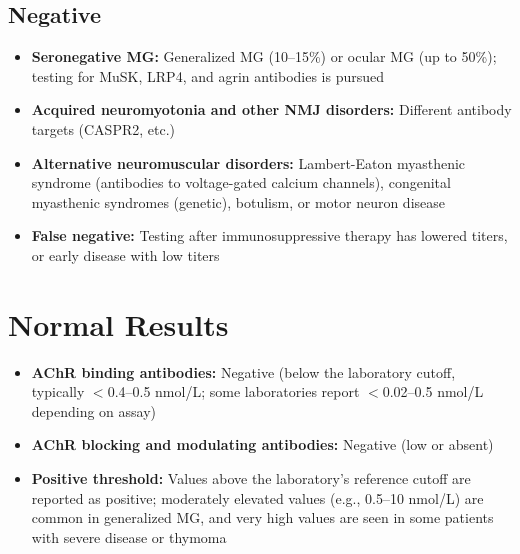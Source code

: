 \subsection*{Negative}
\begin{itemize}
  \item \textbf{Seronegative MG:} Generalized MG (10--15\%) or ocular MG (up to 50\%); testing for MuSK, LRP4, and agrin antibodies is pursued
  \item \textbf{Acquired neuromyotonia and other NMJ disorders:} Different antibody targets (CASPR2, etc.)
  \item \textbf{Alternative neuromuscular disorders:} Lambert-Eaton myasthenic syndrome (antibodies to voltage-gated calcium channels), congenital myasthenic syndromes (genetic), botulism, or motor neuron disease
  \item \textbf{False negative:} Testing after immunosuppressive therapy has lowered titers, or early disease with low titers
\end{itemize}

\section*{Normal Results}
\begin{itemize}
  \item \textbf{AChR binding antibodies:} Negative (below the laboratory cutoff, typically $<$0.4--0.5 nmol/L; some laboratories report $<$0.02--0.5 nmol/L depending on assay)
  \item \textbf{AChR blocking and modulating antibodies:} Negative (low or absent)
  \item \textbf{Positive threshold:} Values above the laboratory's reference cutoff are reported as positive; moderately elevated values (e.g., 0.5--10 nmol/L) are common in generalized MG, and very high values are seen in some patients with severe disease or thymoma
\end{itemize}

